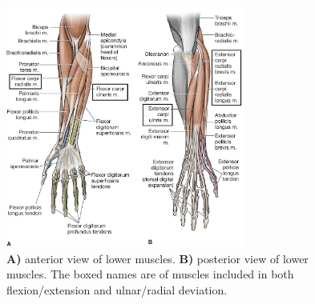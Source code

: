 \begin{figure}[H]
	\includegraphics[width=0.7\textwidth]{figures/xBackground/aAnatomy/lowerArm}
	\caption{\textbf{A)} anterior view of lower muscles. \textbf{B)} posterior view of lower muscles. The boxed names are of muscles included in both flexion/extension and ulnar/radial deviation. \cite{7semesterprojekt}}
	\label{fig:lowerArm}
\end{figure}




